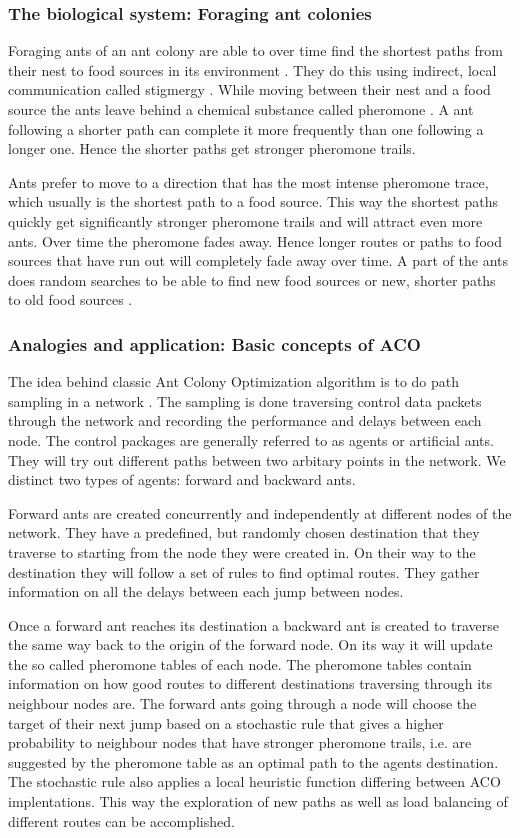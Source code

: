 \documentclass{IWORK2014}
\begin{document}
\subsubsection{The biological system: Foraging ant colonies}
Foraging ants of an ant colony are able to over time find the shortest paths from their nest to food sources in its environment \cite{dorigo1999ant, goss1989self}. They do this using indirect, local communication called stigmergy \cite{grasse1959reconstruction}. While moving between their nest and a food source the ants leave behind a chemical substance called pheromone \cite{ghosh2008aggregation}. A ant following a shorter path can complete it more frequently than one following a longer one. Hence the shorter paths get stronger pheromone trails.

Ants prefer to move to a direction that has the most intense pheromone trace, which usually is the shortest path to a food source. This way the shortest paths quickly get significantly stronger pheromone trails and will attract even more ants. Over time the pheromone fades away. Hence longer routes or paths to food sources that have run out will completely fade away over time. A part of the ants does random searches to be able to find new food sources or new, shorter paths to old food sources \cite{dressler2010bio}.

\subsubsection{Analogies and application: Basic concepts of ACO}
The idea behind classic Ant Colony Optimization algorithm is to do path sampling in a network \cite{di2004ant, di2008theory}. The sampling is done traversing control data packets through the network and recording the performance and delays between each node. The control packages are generally referred to as agents or artificial ants. They will try out different paths between two arbitary points in the network. We distinct two types of agents: forward and backward ants.

Forward ants are created concurrently and independently at different nodes of the network. They have a predefined, but randomly chosen destination that they traverse to starting from the node they were created in. On their way to the destination they will follow a set of rules to find optimal routes. They gather information on all the delays between each jump between nodes.

Once a forward ant reaches its destination a backward ant is created to traverse the same way back to the origin of the forward node. On its way it will update the so called pheromone tables of each node. The pheromone tables contain information on how good routes to different destinations traversing through its neighbour nodes are. The forward ants going through a node will choose the target of their next jump based on a stochastic rule that gives a higher probability to neighbour nodes that have stronger pheromone trails, i.e. are suggested by the pheromone table as an optimal path to the agents destination. The stochastic rule also applies a local heuristic function differing between ACO implentations. This way the exploration of new paths as well as load balancing of different routes can be accomplished.
\end{document}
